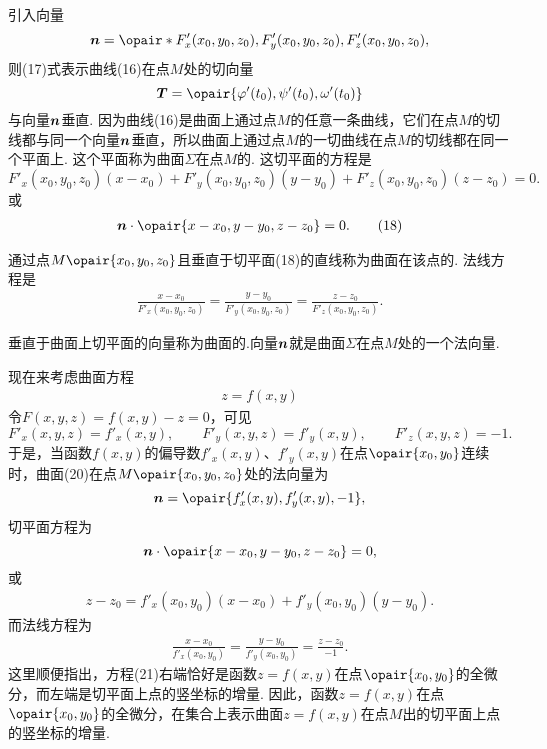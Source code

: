 引入向量\begin{equation}
\mat{n}=\opair*{F'_x(x_0,y_0,z_0),F'_y(x_0,y_0,z_0),F'_z(x_0,y_0,z_0)},
\end{equation}则(17)式表示曲线(16)在点\(M\)处的切向量\[
\mat{T} = \opair{\varphi'(t_0),\psi'(t_0),\omega'(t_0)}
\]与向量\(\boldsymbol{n}\)垂直.
因为曲线(16)是曲面上通过点\(M\)的任意一条曲线，它们在点\(M\)的切线都与同一个向量\(\boldsymbol{n}\)垂直，所以曲面上通过点\(M\)的一切曲线在点\(M\)的切线都在同一个平面上.
这个平面称为曲面\(\Sigma\)在点\(M\)的.
这切平面的方程是\[
F'_x(x_0,y_0,z_0) (x-x_0)
+ F'_y(x_0,y_0,z_0) (y-y_0)
+ F'_z(x_0,y_0,z_0) (z-z_0)
= 0.
\]或\begin{gather}
\mat{n}\cdot\opair{x-x_0,y-y_0,z-z_0}=0.
\tag{18}
\end{gather}

通过点\(M\opair{x_0,y_0,z_0}\)且垂直于切平面(18)的直线称为曲面在该点的.
法线方程是\begin{gather}
\frac{x-x_0}{F'_x(x_0,y_0,z_0)}
=\frac{y-y_0}{F'_y(x_0,y_0,z_0)}
=\frac{z-z_0}{F'_z(x_0,y_0,z_0)}.
\tag{19}
\end{gather}

垂直于曲面上切平面的向量称为曲面的.向量\(\boldsymbol{n}\)就是曲面\(\Sigma\)在点\(M\)处的一个法向量.


现在来考虑曲面方程\begin{gather}
z = f(x,y)
\tag{20}
\end{gather}
令\(F(x,y,z)=f(x,y)-z=0\)，可见\[
F'_x(x,y,z) = f'_x(x,y),
\qquad
F'_y(x,y,z) = f'_y(x,y),
\qquad
F'_z(x,y,z) = -1.
\]于是，当函数\(f(x,y)\)的偏导数\(f'_x(x,y)\)、\(f'_y(x,y)\)在点\(\opair{x_0,y_0}\)连续时，曲面(20)在点\(M\opair{x_0,y_0,z_0}\)处的法向量为\[
\mat{n}=\opair{f'_x(x,y),f'_y(x,y),-1},
\]切平面方程为\[
\mat{n}\cdot\opair{x-x_0,y-y_0,z-z_0}=0,
\]或\begin{gather}
z-z_0 = f'_x(x_0,y_0) (x-x_0) + f'_y(x_0,y_0) (y-y_0).
\tag{21}
\end{gather}而法线方程为\begin{gather}
\frac{x-x_0}{f'_x(x_0,y_0)}
=\frac{y-y_0}{f'_y(x_0,y_0)}
=\frac{z-z_0}{-1}.
\tag{22}
\end{gather}
这里顺便指出，方程(21)右端恰好是函数\(z = f(x,y)\)在点\(\opair{x_0,y_0}\)的全微分，而左端是切平面上点的竖坐标的增量.
因此，函数\(z = f(x,y)\)在点\(\opair{x_0,y_0}\)的全微分，在集合上表示曲面\(z = f(x,y)\)在点\(M\)出的切平面上点的竖坐标的增量.


